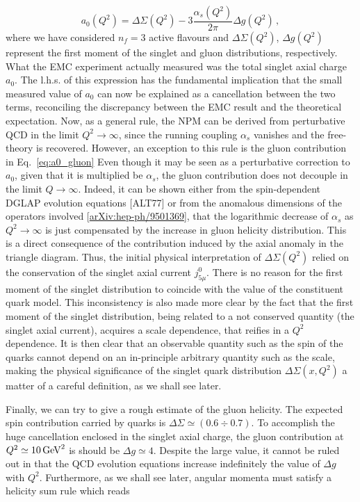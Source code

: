 \begin{equation}
  a_{0} (Q^2) = \Delta \Sigma (Q^2) - 3 \frac{\alpha_{s}(Q^2)}{2\pi} \Delta g (Q^2) \,,
  \label{eq:a0_gluon}
\end{equation}
where we have considered $n_f = 3$ active flavours and $\Delta \Sigma(Q^2)$, $\Delta g(Q^2)$ represent the first moment of the singlet and gluon distributions, respectively. What the EMC experiment actually measured was the total singlet axial charge $a_0$. The l.h.s. of this expression has the fundamental implication that the small measured value of $a_0$ can now be explained as a cancellation between the two terms, reconciling the discrepancy between the EMC result and the theoretical expectation. Now, as a general rule, the NPM can be derived from perturbative QCD in the limit $Q^2 \rightarrow \infty$, since the running coupling $\alpha_s$ vanishes and the free-theory is recovered. However, an exception to this rule is the gluon contribution in Eq.~\eqref{eq:a0_gluon} Even though it may be seen as a perturbative correction to $a_0$, given that it is multiplied be $\alpha_s$, the gluon contribution does not decouple in the limit $Q \rightarrow \infty$. Indeed, it can be shown either from the spin-dependent DGLAP evolution equations [ALT77] or from the anomalous dimensions of the operators involved [\href{https://arxiv.org/abs/hep-ph/9501369}{arXiv:hep-ph/9501369}], that the logarithmic decrease of $\alpha_s$ as $Q^2 \rightarrow \infty$ is just compensated by the increase in gluon helicity distribution. This is a direct consequence of the contribution induced by the axial anomaly in the triangle diagram. Thus, the initial physical interpretation of $\Delta \Sigma (Q^2)$ relied on the conservation of the singlet axial current $j_{5\mu}^{0}$. There is no reason for the first moment of the singlet distribution to coincide with the value of the constituent quark model. This inconsistency is also made more clear by the fact that the first moment of the singlet distribution, being related to a not conserved quantity (the singlet axial current), acquires a scale dependence, that reifies in a $Q^2$ dependence. It is then clear that an observable quantity such as the spin of the quarks cannot depend on an in-principle arbitrary quantity such as the scale, making the physical significance of the singlet quark distribution $\Delta \Sigma(x,Q^2)$ a matter of a careful definition, as we shall see later.\par
Finally, we can try to give a rough estimate of the gluon helicity. The expected spin contribution carried by quarks is $\Delta \Sigma \simeq (0.6  \div 0.7)$. To accomplish the huge cancellation enclosed in the singlet axial charge, the gluon contribution at $Q^2 \simeq 10 \, \textrm{GeV}^2$ is should be $\Delta g \simeq 4$. Despite the large value, it cannot be ruled out in that the QCD evolution equations increase indefinitely the value of $\Delta g$ with $Q^2$. Furthermore, as we shall see later, angular momenta must satisfy a helicity sum rule which reads
